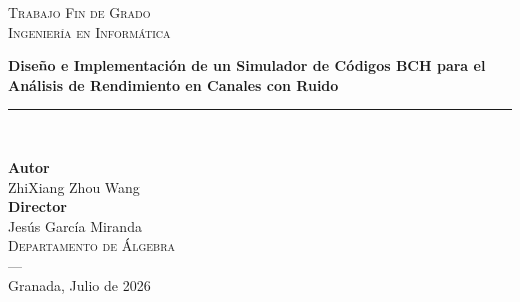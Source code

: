 \begin{titlepage}

\setlength{\centeroffset}{-0.5\oddsidemargin}
\addtolength{\centeroffset}{0.5\evensidemargin}
\thispagestyle{empty}

\noindent\hspace*{\centeroffset}\begin{minipage}{\textwidth}
\centering

\vspace*{1cm} %

{\large \textsc{Trabajo Fin de Grado}} \\[0.5cm]
{\large \textsc{Ingeniería en Informática}}

\vfill %

{\huge\bfseries Diseño e Implementación de un Simulador de Códigos BCH para el Análisis de Rendimiento en Canales con Ruido\\[0.5cm]}

\noindent\rule[-1ex]{\textwidth}{3pt}\\[2ex]

\vfill 

\end{minipage}

\vfill %

\noindent\hspace*{\centeroffset}\begin{minipage}{\textwidth}
\centering

\textbf{Autor}\\[0.5ex] 
{ZhiXiang Zhou Wang}\\[3ex]

\textbf{Director}\\[0.5ex]
{Jesús García Miranda}\\[3cm] %

\textsc{Departamento de Álgebra}\\ 
\textsc{---}\\
Granada, Julio de 2026
\end{minipage}

\vspace*{1cm} %
\end{titlepage}